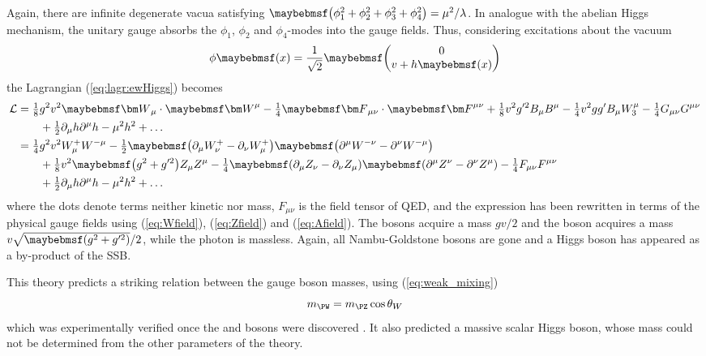 Again, there are infinite degenerate vacua satisfying 
$\parenths{\phi_1^2 + \phi_2^2 + \phi_3^2 + \phi_4^2} = \mu^2/\lambda$. In analogue with 
the abelian Higgs mechanism, the unitary gauge absorbs the $\phi_1$, $\phi_2$ and 
$\phi_4$-modes into the gauge fields. Thus, considering excitations about the vacuum
\begin{equation}
	\phi\parenths{x} = \frac{1}{\sqrt{2}} \colvector{0\\  
	v + h\parenths{x}} \label{eq:higgs_doublet}
\end{equation}
the Lagrangian (\ref{eq:lagr:ewHiggs}) becomes
\begin{align}
	\mathcal{L} &= \tfrac{1}{8} g^2 v^2 \bvec{W}_{\mu} \cdot \bvec{W}^{\mu} - \tfrac{1}{4} \bvec{F}_{\mu\nu} \cdot \bvec{F}^{\mu\nu} + \tfrac{1}{8} v^2 g'^2 B_{\mu} B^{\mu} - \tfrac{1}{4} v^2 gg' B_{\mu} W_{3}^{\mu} - \tfrac{1}{4} G_{\mu\nu} G^{\mu\nu} \nonumber \\
	&\quad\quad {} + \tfrac{1}{2} \partial_{\mu}h \partial^{\mu}h - \mu^2 h^2 + \dots \\
	&= \tfrac{1}{4} g^2 v^2 W^{+}_{\mu} W^{-\mu} - \tfrac{1}{2} \parenths{\partial_{\mu}W^{+}_{\nu} - \partial_{\nu}W^{+}_{\mu}} \parenths{\partial^{\mu}W^{-\nu} - \partial^{\nu}W^{-\mu}} \nonumber \\
	&\quad\quad {} + \tfrac{1}{8} v^2 \parenths{g^2 + g'^2} Z_{\mu} Z^{\mu} - \tfrac{1}{4} \parenths{\partial_{\mu}Z_{\nu} - \partial_{\nu}Z_{\mu}} \parenths{\partial^{\mu}Z^{\nu} - \partial^{\nu}Z^{\mu}} - \tfrac{1}{4} F_{\mu\nu} F^{\mu\nu} \nonumber \\
	&\quad\quad {} + \tfrac{1}{2} \partial_{\mu}h \partial^{\mu}h - \mu^2 h^2 + \dots
\end{align}
where the dots denote terms neither kinetic nor mass, $F_{\mu\nu}$ is the field tensor of
\ac{QED}, and the expression has been rewritten in terms of the physical gauge fields 
using (\ref{eq:Wfield}), (\ref{eq:Zfield}) and (\ref{eq:Afield}). The \PWpm bosons 
acquire a mass $gv/2$ and the \PZ boson acquires a mass $v \sqrt{\parenths{g^2+g'^2}}/2$, 
while the photon is massless. Again, all Nambu-Goldstone bosons are gone and a Higgs 
boson has appeared as a by-product of the \ac{SSB}.

This theory predicts a striking relation between the gauge boson masses, using 
(\ref{eq:weak_mixing})
\begin{equation}
	m_{\PW} = m_{\PZ} \cos\theta_W
\end{equation}
which was experimentally verified once the \PW and \PZ bosons were discovered 
\cite{UA1:Wboson,UA2:Wboson,UA1:Zboson,UA2:Zboson,UA1:1989}. It also predicted a massive 
scalar Higgs boson, whose mass could not be determined from the other parameters of the 
theory.

